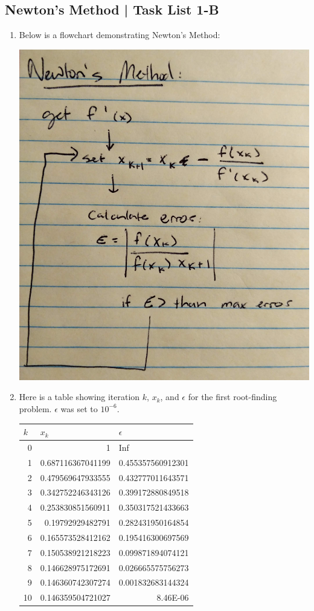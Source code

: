 \documentclass[12pt]{extarticle}
\begin{document}
\subsection{Newton's Method | Task List 1-B}
\begin{enumerate}
\item Below is a flowchart demonstrating Newton's Method:
\begin{center}
\includegraphics[width = .6\textwidth]{pic_4}
\end{center}
\item Here is a table showing iteration $k$, $x_k$, and $\epsilon$ for the first root-finding problem. $\epsilon$ was set to $10^{-6}$.

\begin{center}
\begin{adjustbox}{width=.45\columnwidth,center}
\begin{tabular}{|r|r|r|}
\hline
\multicolumn{1}{|l|}{$k$} & \multicolumn{1}{l|}{$x_k$} & \multicolumn{1}{l|}{$\epsilon$} \\ \hline
0 & 1 & \multicolumn{1}{l|}{Inf} \\ \hline
1 & 0.687116367041199 & 0.455357560912301 \\ \hline
2 & 0.479569647933555 & 0.432777011643571 \\ \hline
3 & 0.342752246343126 & 0.399172880849518 \\ \hline
4 & 0.253830851560911 & 0.350317521433663 \\ \hline
5 & 0.19792929482791 & 0.282431950164854 \\ \hline
6 & 0.165573528412162 & 0.195416300697569 \\ \hline
7 & 0.150538921218223 & 0.099871894074121 \\ \hline
8 & 0.146628975172691 & 0.026665575756273 \\ \hline
9 & 0.146360742307274 & 0.001832683144324 \\ \hline
10 & 0.146359504721027 & 8.46E-06 \\ \hline
\end{tabular}
\end{adjustbox}
\label{}


\end{center}
\end{enumerate}
\end{document}
